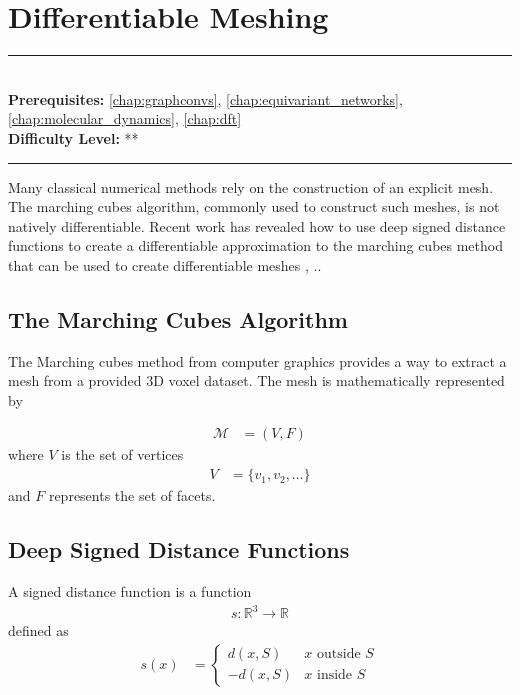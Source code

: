 \documentclass[book.tex]{subfiles}
\begin{document}
\chapter{Differentiable Meshing}


\label{chap:differentiable_meshing}
\noindent\rule{11cm}{0.4pt} \\
\textbf{Prerequisites:} \autoref{chap:graphconvs}, \autoref{chap:equivariant_networks}, \autoref{chap:molecular_dynamics},  \autoref{chap:dft} \\
\textbf{Difficulty Level:} ** \\
\noindent\rule{11cm}{0.4pt}
\vspace{5mm}

Many classical numerical methods rely on the construction of an explicit mesh. The marching cubes algorithm, commonly used to construct such meshes, is not natively differentiable. Recent work has revealed how to use deep signed distance functions to create a differentiable approximation to the marching cubes method that can be used to create differentiable meshes \cite{remelli2020meshsdf}, \cite{liu2020general}..

\section{The Marching Cubes Algorithm}

The Marching cubes method from computer graphics provides a way to extract a mesh from a provided 3D voxel dataset. The mesh is mathematically represented by

\begin{align}
\mathcal{M} &= (V, F)
\end{align}
where $V$ is the set of vertices
\begin{align}
V &= \{v_1, v_2, \dotsc \}
\end{align}
and $F$ represents the set of facets.

\section{Deep Signed Distance Functions}
A signed distance function is a function
\begin{align}
s: \mathbb{R}^3 \to \mathbb{R}
\end{align}
defined as
\begin{align}
s(x) &= \begin{cases}
d(x, S) & x \textrm{ outside } S \\
-d(x, S) & x \textrm{ inside } S
\end{cases}
\end{align}
\end{document}
